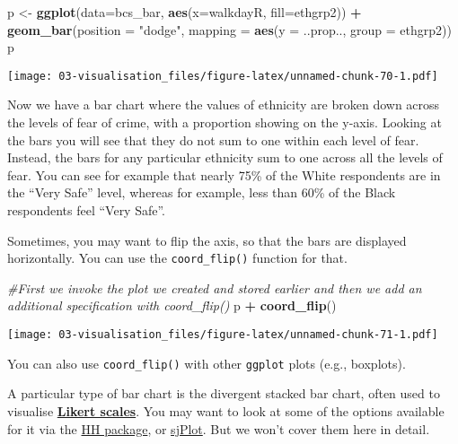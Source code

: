 \documentclass[
]{book}
\newenvironment{Shaded}{\begin{snugshade}}{\end{snugshade}}
\newcommand{\AttributeTok}[1]{\textcolor[rgb]{0.13,0.29,0.53}{#1}}
\newcommand{\CommentTok}[1]{\textcolor[rgb]{0.56,0.35,0.01}{\textit{#1}}}
\newcommand{\FunctionTok}[1]{\textcolor[rgb]{0.13,0.29,0.53}{\textbf{#1}}}
\newcommand{\NormalTok}[1]{#1}
\newcommand{\OtherTok}[1]{\textcolor[rgb]{0.56,0.35,0.01}{#1}}
\newcommand{\SpecialCharTok}[1]{\textcolor[rgb]{0.81,0.36,0.00}{\textbf{#1}}}
\newcommand{\StringTok}[1]{\textcolor[rgb]{0.31,0.60,0.02}{#1}}
\begin{document}
\begin{Shaded}
\begin{Highlighting}[]
\NormalTok{p }\OtherTok{\textless{}{-}} \FunctionTok{ggplot}\NormalTok{(}\AttributeTok{data=}\NormalTok{bcs\_bar, }\FunctionTok{aes}\NormalTok{(}\AttributeTok{x=}\NormalTok{walkdayR, }\AttributeTok{fill=}\NormalTok{ethgrp2)) }\SpecialCharTok{+} \FunctionTok{geom\_bar}\NormalTok{(}\AttributeTok{position =} \StringTok{"dodge"}\NormalTok{,}
             \AttributeTok{mapping =} \FunctionTok{aes}\NormalTok{(}\AttributeTok{y =}\NormalTok{ ..prop.., }\AttributeTok{group =}\NormalTok{ ethgrp2))}
\NormalTok{p}
\end{Highlighting}
\end{Shaded}

\texttt{[image: 03-visualisation\_files/figure-latex/unnamed-chunk-70-1.pdf]}

Now we have a bar chart where the values of ethnicity are broken down across the levels of fear of crime, with a proportion showing on the y-axis. Looking at the bars you will see that they do not sum to one within each level of fear. Instead, the bars for any particular ethnicity sum to one across all the levels of fear. You can see for example that nearly 75\% of the White respondents are in the ``Very Safe'' level, whereas for example, less than 60\% of the Black respondents feel ``Very Safe''.

Sometimes, you may want to flip the axis, so that the bars are displayed horizontally. You can use the \texttt{coord\_flip()} function for that.

\begin{Shaded}
\begin{Highlighting}[]
\CommentTok{\#First we invoke the plot we created and stored earlier and then we add an additional specification with coord\_flip()}
\NormalTok{p }\SpecialCharTok{+} \FunctionTok{coord\_flip}\NormalTok{()}
\end{Highlighting}
\end{Shaded}

\texttt{[image: 03-visualisation\_files/figure-latex/unnamed-chunk-71-1.pdf]}

You can also use \texttt{coord\_flip()} with other \texttt{ggplot} plots (e.g., boxplots).

A particular type of bar chart is the divergent stacked bar chart, often used to visualise \href{http://en.wikipedia.org/wiki/Likert_scale}{\textbf{Likert scales}}. You may want to look at some of the options available for it via the \href{http://www.jstatsoft.org/v57/i05/paper}{HH package}, or \href{http://strengejacke.wordpress.com/2013/07/17/plotting-likert-scales-net-stacked-distributions-with-ggplot-rstats/}{sjPlot}. But we won't cover them here in detail.
\end{document}
